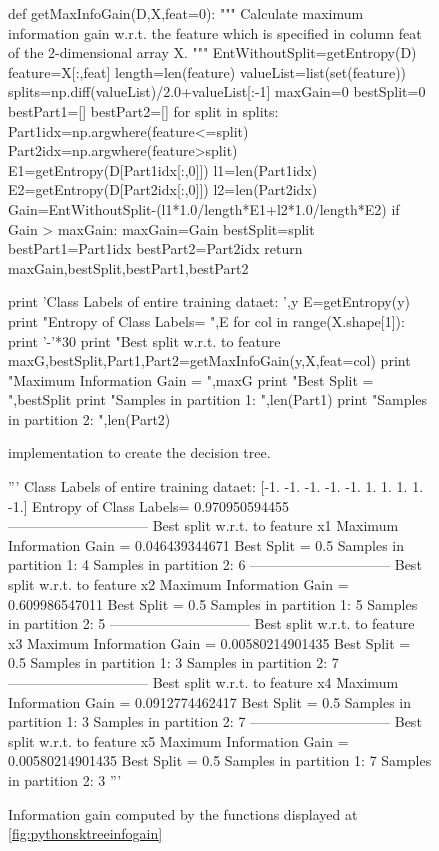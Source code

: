 \documentclass[a4paper, 11pt]{article}
\begin{document}
\begin{enumerate}[(a)]
\begin{figure}
\begin{python}[caption={SVM Primal Form},label={lst:pythonsktree}]
def getMaxInfoGain(D,X,feat=0):
    """ 
    Calculate maximum information gain w.r.t. the feature which is specified in column feat of the 2-dimensional array X.
    """
    EntWithoutSplit=getEntropy(D)
    feature=X[:,feat]
    length=len(feature)
    valueList=list(set(feature))
    splits=np.diff(valueList)/2.0+valueList[:-1]
    maxGain=0
    bestSplit=0
    bestPart1=[]
    bestPart2=[]
    for split in splits:
        Part1idx=np.argwhere(feature<=split)
        Part2idx=np.argwhere(feature>split)
        E1=getEntropy(D[Part1idx[:,0]])
        l1=len(Part1idx)
        E2=getEntropy(D[Part2idx[:,0]])
        l2=len(Part2idx)
        Gain=EntWithoutSplit-(l1*1.0/length*E1+l2*1.0/length*E2)
        if Gain > maxGain:
            maxGain=Gain
            bestSplit=split
            bestPart1=Part1idx
            bestPart2=Part2idx
    return maxGain,bestSplit,bestPart1,bestPart2
    
print 'Class Labels of entire training dataet: ',y    
E=getEntropy(y)
print "Entropy of Class Labels= ",E
for col in range(X.shape[1]):
    print '-'*30
    print "Best split w.r.t. to feature %
    maxG,bestSplit,Part1,Part2=getMaxInfoGain(y,X,feat=col)
    print "Maximum Information Gain = ",maxG
    print "Best Split = ",bestSplit
    print "Samples in partition 1: ",len(Part1)
    print "Samples in partition 2: ",len(Part2)
\end{python}
\caption[]{ implementation to create the decision tree.}
\label{fig:pythonsktreeinfogain}
\end{figure}

\begin{figure}
\begin{python}[caption={SVM Primal Form},label={lst:pythonsktree}]
'''
Class Labels of entire training dataet:  [-1. -1. -1. -1. -1.  1.  1.  1.  1. -1.]
Entropy of Class Labels=  0.970950594455
------------------------------
Best split w.r.t. to feature x1
Maximum Information Gain =  0.046439344671
Best Split =  0.5
Samples in partition 1:  4
Samples in partition 2:  6
------------------------------
Best split w.r.t. to feature x2
Maximum Information Gain =  0.609986547011
Best Split =  0.5
Samples in partition 1:  5
Samples in partition 2:  5
------------------------------
Best split w.r.t. to feature x3
Maximum Information Gain =  0.00580214901435
Best Split =  0.5
Samples in partition 1:  3
Samples in partition 2:  7
------------------------------
Best split w.r.t. to feature x4
Maximum Information Gain =  0.0912774462417
Best Split =  0.5
Samples in partition 1:  3
Samples in partition 2:  7
------------------------------
Best split w.r.t. to feature x5
Maximum Information Gain =  0.00580214901435
Best Split =  0.5
Samples in partition 1:  7
Samples in partition 2:  3
'''
\end{python}
\caption[]{Information gain computed by the functions displayed at \autoref{fig:pythonsktreeinfogain}}
\label{fig:pythonsktreeinfogain1}
\end{figure}
\end{enumerate}
\end{document}
